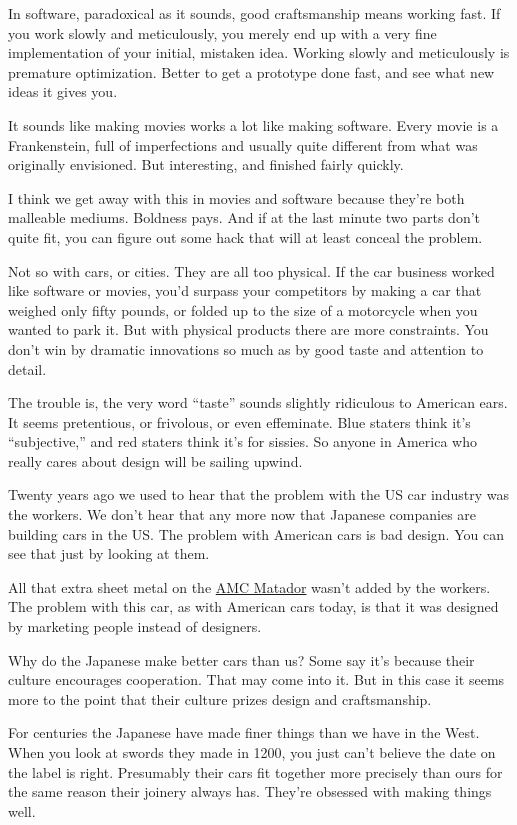 In software, paradoxical as it sounds, good craftsmanship means working
fast. If you work slowly and meticulously, you merely end up with a very
fine implementation of your initial, mistaken idea. Working slowly and
meticulously is premature optimization. Better to get a prototype done
fast, and see what new ideas it gives you.

It sounds like making movies works a lot like making software. Every
movie is a Frankenstein, full of imperfections and usually quite
different from what was originally envisioned. But interesting, and
finished fairly quickly.

I think we get away with this in movies and software because they're
both malleable mediums. Boldness pays. And if at the last minute two
parts don't quite fit, you can figure out some hack that will at least
conceal the problem.

Not so with cars, or cities. They are all too physical. If the car
business worked like software or movies, you'd surpass your competitors
by making a car that weighed only fifty pounds, or folded up to the size
of a motorcycle when you wanted to park it. But with physical products
there are more constraints. You don't win by dramatic innovations so
much as by good taste and attention to detail.

The trouble is, the very word ``taste'' sounds slightly ridiculous to
American ears. It seems pretentious, or frivolous, or even effeminate.
Blue staters think it's ``subjective,'' and red staters think it's for
sissies. So anyone in America who really cares about design will be
sailing upwind.

Twenty years ago we used to hear that the problem with the US car
industry was the workers. We don't hear that any more now that Japanese
companies are building cars in the US. The problem with American cars is
bad design. You can see that just by looking at them.

All that extra sheet metal on the \href{matador.html}{AMC Matador}
wasn't added by the workers. The problem with this car, as with American
cars today, is that it was designed by marketing people instead of
designers.

Why do the Japanese make better cars than us? Some say it's because
their culture encourages cooperation. That may come into it. But in this
case it seems more to the point that their culture prizes design and
craftsmanship.

For centuries the Japanese have made finer things than we have in the
West. When you look at swords they made in 1200, you just can't believe
the date on the label is right. Presumably their cars fit together more
precisely than ours for the same reason their joinery always has.
They're obsessed with making things well.

